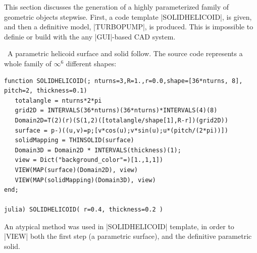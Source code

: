 \begin{coding}
This section discusses the generation of a highly parameterized family of geometric objects stepwise. First, a code template |SOLIDHELICOID|, is given, and then a definitive model, |TURBOPUMP|, is produced. This is impossible to definie or build with the any |GUI|-based CAD system.

\begin{coding}\ A parametric helicoid surface and solid follow. The source code represents a whole family of $\infty^6$ different shapes:
\begin{lstlisting}[language=JuliaLocal, style=julia, mathescape=true]
function SOLIDHELICOID(; nturns=3,R=1.,r=0.0,shape=[36*nturns, 8], pitch=2, thickness=0.1)
   totalangle = nturns*2*pi
   grid2D = INTERVALS(36*nturns)(36*nturns)*INTERVALS(4)(8)
   Domain2D=T(2)(r)(S(1,2)([totalangle/shape[1],R-r])(grid2D))
   surface = p-)((u,v)=p;[v*cos(u);v*sin(u);u*(pitch/(2*pi))])
   solidMapping = THINSOLID(surface)
   Domain3D = Domain2D * INTERVALS(thickness)(1);
   view = Dict("background_color"=)[1.,1,1])
   VIEW(MAP(surface)(Domain2D), view)
   VIEW(MAP(solidMapping)(Domain3D), view)
end;

julia) SOLIDHELICOID( r=0.4, thickness=0.2 )
\end{lstlisting}
\end{coding}

An atypical method was used in |SOLIDHELICOID| template, in order to |VIEW| both the first  step (a parametric surface), and the definitive parametric solid.
 

\end{coding}
